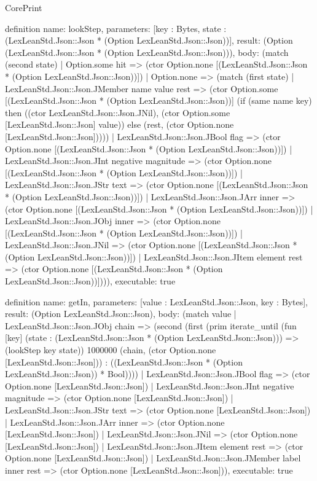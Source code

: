 \begin{lexlean}{CorePrint}
\begin{semanticmodule}
definition{
  name: lookStep,
  parameters: [key : Bytes, state : (LexLeanStd.Json::Json * (Option LexLeanStd.Json::Json))],
  result: (Option (LexLeanStd.Json::Json * (Option LexLeanStd.Json::Json))),
  body: (match (second state)
    | Option.some hit => (ctor Option.none [(LexLeanStd.Json::Json * (Option LexLeanStd.Json::Json))])
    | Option.none => (match (first state)
      | LexLeanStd.Json::Json.JMember name value rest => (ctor Option.some [(LexLeanStd.Json::Json * (Option LexLeanStd.Json::Json))] (if (same name key) then ((ctor LexLeanStd.Json::Json.JNil), (ctor Option.some [LexLeanStd.Json::Json] value)) else (rest, (ctor Option.none [LexLeanStd.Json::Json]))))
      | LexLeanStd.Json::Json.JBool flag => (ctor Option.none [(LexLeanStd.Json::Json * (Option LexLeanStd.Json::Json))])
      | LexLeanStd.Json::Json.JInt negative magnitude => (ctor Option.none [(LexLeanStd.Json::Json * (Option LexLeanStd.Json::Json))])
      | LexLeanStd.Json::Json.JStr text => (ctor Option.none [(LexLeanStd.Json::Json * (Option LexLeanStd.Json::Json))])
      | LexLeanStd.Json::Json.JArr inner => (ctor Option.none [(LexLeanStd.Json::Json * (Option LexLeanStd.Json::Json))])
      | LexLeanStd.Json::Json.JObj inner => (ctor Option.none [(LexLeanStd.Json::Json * (Option LexLeanStd.Json::Json))])
      | LexLeanStd.Json::Json.JNil => (ctor Option.none [(LexLeanStd.Json::Json * (Option LexLeanStd.Json::Json))])
      | LexLeanStd.Json::Json.JItem element rest => (ctor Option.none [(LexLeanStd.Json::Json * (Option LexLeanStd.Json::Json))]))),
  executable: true
}

definition{
  name: getIn,
  parameters: [value : LexLeanStd.Json::Json, key : Bytes],
  result: (Option LexLeanStd.Json::Json),
  body: (match value
    | LexLeanStd.Json::Json.JObj chain => (second (first (prim iterate_until (fun [key] (state : (LexLeanStd.Json::Json * (Option LexLeanStd.Json::Json))) => (lookStep key state)) 1000000 (chain, (ctor Option.none [LexLeanStd.Json::Json])) : ((LexLeanStd.Json::Json * (Option LexLeanStd.Json::Json)) * Bool))))
    | LexLeanStd.Json::Json.JBool flag => (ctor Option.none [LexLeanStd.Json::Json])
    | LexLeanStd.Json::Json.JInt negative magnitude => (ctor Option.none [LexLeanStd.Json::Json])
    | LexLeanStd.Json::Json.JStr text => (ctor Option.none [LexLeanStd.Json::Json])
    | LexLeanStd.Json::Json.JArr inner => (ctor Option.none [LexLeanStd.Json::Json])
    | LexLeanStd.Json::Json.JNil => (ctor Option.none [LexLeanStd.Json::Json])
    | LexLeanStd.Json::Json.JItem element rest => (ctor Option.none [LexLeanStd.Json::Json])
    | LexLeanStd.Json::Json.JMember label inner rest => (ctor Option.none [LexLeanStd.Json::Json])),
  executable: true
}


\end{semanticmodule}
\end{lexlean}
